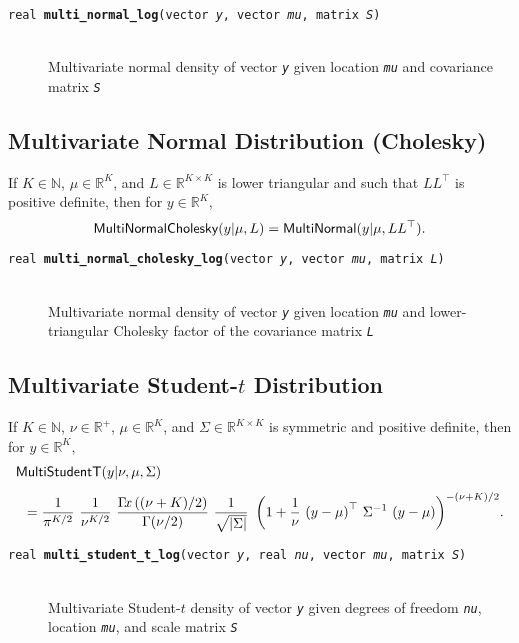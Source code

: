 \documentclass[10pt]{report}
\newcommand{\distro}[1]{\mbox{\sf #1}}
\newcommand{\reals}{\mathbb{R}}
\newcommand{\posreals}{\mathbb{R}^+}
\newcommand{\nats}{\mathbb{N}}
\newcommand{\fitem}[4]{\item[{\tt #1 {\bfseries #2}(#3)}]\mbox{ } \\[4pt] #4}
\newcommand{\farg}[1]{{\tt\slshape #1}}
\begin{document}
\begin{description}
%
\fitem{real}{multi\_normal\_log}{vector \farg{y}, vector \farg{mu},
 matrix \farg{S}}{Multivariate normal density of vector \farg{y}
 given location \farg{mu} and covariance matrix \farg{S}}
%
\end{description}

\subsection{Multivariate Normal Distribution (Cholesky)}

If $K \in \nats$, $\mu \in \reals^K$, and $L \in \reals^{K \times K}$ is lower
triangular and such that $LL^{\top}$ is positive definite, then for $y
\in \reals^K$,
\[
\distro{MultiNormalCholesky}(y|\mu,L)
=
\distro{MultiNormal}(y|\mu,LL^{\top}).
\]

\begin{description}
%
\fitem{real}{multi\_normal\_cholesky\_log}{vector \farg{y}, vector
  \farg{mu}, matrix \farg{L}}{Multivariate normal density of vector
  \farg{y} given location \farg{mu} and lower-triangular Cholesky
  factor of the covariance matrix \farg{L}}
%
\end{description}


\subsection{Multivariate Student-$t$ Distribution}

If $K \in \nats$, $\nu \in \posreals$, $\mu \in \reals^K$, and $\Sigma
\in \reals^{K \times K}$ is symmetric and positive definite, then for
$y \in \reals^K$,
\[
\begin{array}{l}
\distro{MultiStudentT}(y|\nu,\mu,\Sigma)
\\[8pt]
\displaystyle
\hspace*{8pt}
=
\frac{1}{\pi^{K/2}}
\
\frac{1}{\nu^{K/2}}
\
\frac{\Gamma\!x\left((\nu + K)/2\right)}
     {\Gamma(\nu/2)}
\
\frac{1}{\sqrt{\left| \Sigma \right|}}
\
\left(
1 + \frac{1}{\nu} \, \left(y - \mu\right)^{\top} \, \Sigma^{-1} \, \left(y - \mu\right)
\right)^{-(\nu + K)/2}
\! .
\end{array}
\]
\vspace*{4pt}

\begin{description}
%
\fitem{real}{multi\_student\_t\_log}{vector \farg{y}, real \farg{nu},
  vector \farg{mu}, matrix \farg{S}}{Multivariate Student-$t$
  density of vector \farg{y} given degrees of freedom \farg{nu},
  location \farg{mu}, and scale matrix \farg{S}}
%
\end{description}
\end{document}
